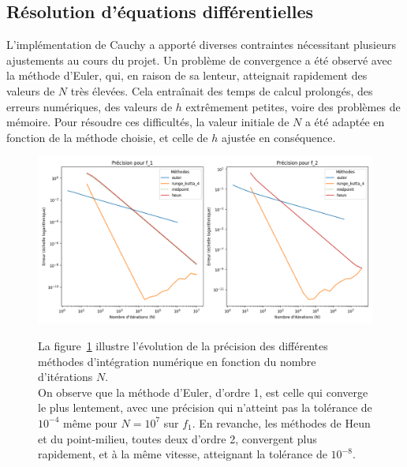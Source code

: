 \documentclass{article}
\begin{document}
\subsection{Résolution d'équations différentielles}
L'implémentation de Cauchy a apporté diverses contraintes nécessitant plusieurs ajustements au cours du projet. Un problème de convergence a été observé avec la méthode d'Euler, qui, en raison de sa lenteur, atteignait rapidement des valeurs de \(N\) très élevées. Cela entraînait des temps de calcul prolongés, des erreurs numériques, des valeurs de \(h\) extrêmement petites, voire des problèmes de mémoire. Pour résoudre ces difficultés, la valeur initiale de \(N\) a été adaptée en fonction de la méthode choisie, et celle de \(h\) ajustée en conséquence.
\begin{figure}[H]
  \begin{minipage}{0.65\textwidth}
    \centering
    \includegraphics[width=\textwidth]{img/_bis.png}
    \label{fig:precision}
  \end{minipage}
  \hfill
  \begin{minipage}{0.33\textwidth}
    La figure~\ref{fig:precision} illustre l'évolution de la précision des différentes méthodes d'intégration numérique en fonction du nombre d'itérations \(N\). \\
  On observe que la méthode d'Euler, d'ordre 1, est celle qui converge le plus lentement, avec une précision qui n'atteint pas la tolérance de \(10^{-4}\) même pour \(N = 10^7\) sur \(f_1\). En revanche, les méthodes de Heun et du point-milieu, toutes deux d'ordre 2, convergent plus rapidement, et à la même vitesse, atteignant la tolérance de \(10^{-8}\).
  \end{minipage}
\end{figure}
\end{document}

